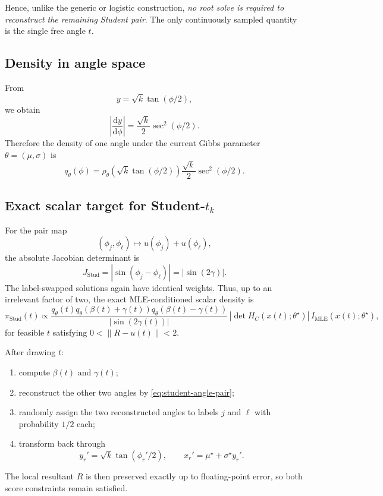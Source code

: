 \documentclass[11pt]{article}
\newcommand{\1}{\mathbf{1}}
\newcommand{\dd}{\mathrm{d}}
\newcommand{\MLE}{\mathrm{MLE}}
\begin{document}
Hence, unlike the generic or logistic construction, \emph{no root solve is required to reconstruct the remaining Student pair}.  The only continuously sampled quantity is the single free angle $t$.

\subsection{Density in angle space}

From
\[
    y=\sqrt{k}\tan(\phi/2),
\]
we obtain
\[
    \left|\frac{\dd y}{\dd\phi}\right|
    =\frac{\sqrt{k}}{2}\sec^2(\phi/2).
\]
Therefore the density of one angle under the current Gibbs parameter $\theta=(\mu,\sigma)$ is
\begin{equation}
\boxed{
    q_\theta(\phi)
    =\rho_\theta\!\left(\sqrt{k}\tan(\phi/2)\right)
      \frac{\sqrt{k}}{2}\sec^2(\phi/2).
}
\label{eq:student-angle-density}
\end{equation}

\subsection{Exact scalar target for Student-$t_k$}

For the pair map
\[
    (\phi_j,\phi_\ell)
    \mapsto
    u(\phi_j)+u(\phi_\ell),
\]
the absolute Jacobian determinant is
\begin{equation}
\boxed{
    J_{\mathrm{Stud}}
    =|\sin(\phi_j-\phi_\ell)|
    =|\sin(2\gamma)|.
}
\end{equation}
The label-swapped solutions again have identical weights.  Thus, up to an irrelevant factor of two, the exact MLE-conditioned scalar density is
\begin{equation}
\boxed{
\pi_{\mathrm{Stud}}(t)
\propto
\frac{
q_\theta(t)
q_\theta(\beta(t)+\gamma(t))
q_\theta(\beta(t)-\gamma(t))
}{|\sin(2\gamma(t))|}
\,|\det H_C(x(t);\theta^\star)|
\,I_{\MLE}(x(t);\theta^\star),
}
\label{eq:student-scalar-target}
\end{equation}
for feasible $t$ satisfying $0<\|R-u(t)\|<2$.

After drawing $t$:
\begin{enumerate}
    \item compute $\beta(t)$ and $\gamma(t)$;
    \item reconstruct the other two angles by \eqref{eq:student-angle-pair};
    \item randomly assign the two reconstructed angles to labels $j$ and $\ell$ with probability $1/2$ each;
    \item transform back through
    \[
        y_r'=\sqrt{k}\tan(\phi_r'/2),
        \qquad
        x_r'=\mu^\star+\sigma^\star y_r'.
    \]
\end{enumerate}
The local resultant $R$ is then preserved exactly up to floating-point error, so both score constraints remain satisfied.
\end{document}
